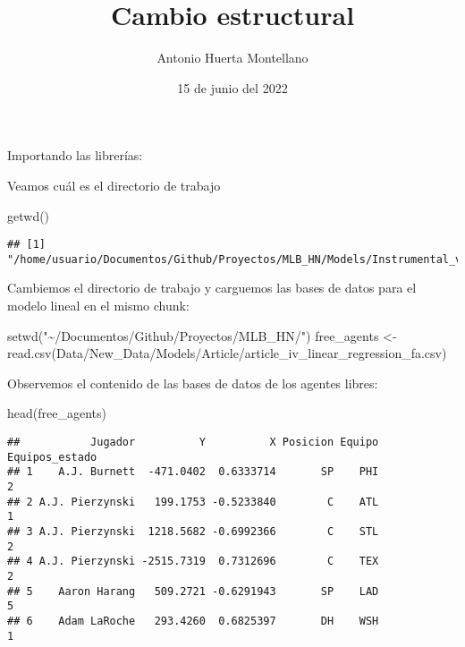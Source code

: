 \documentclass[
]{article}
\title{Cambio estructural}
\author{Antonio Huerta Montellano}
\date{15 de junio del 2022}
\newenvironment{Shaded}{\begin{snugshade}}{\end{snugshade}}
\newcommand{\FunctionTok}[1]{\textcolor[rgb]{0.00,0.00,0.00}{#1}}
\newcommand{\NormalTok}[1]{#1}
\newcommand{\OtherTok}[1]{\textcolor[rgb]{0.56,0.35,0.01}{#1}}
\newcommand{\StringTok}[1]{\textcolor[rgb]{0.31,0.60,0.02}{#1}}
\begin{document}
\maketitle

Importando las librerías:

Veamos cuál es el directorio de trabajo

\begin{Shaded}
\begin{Highlighting}[]
\FunctionTok{getwd}\NormalTok{()}
\end{Highlighting}
\end{Shaded}

\begin{verbatim}
## [1] "/home/usuario/Documentos/Github/Proyectos/MLB_HN/Models/Instrumental_variables/Free_agent"
\end{verbatim}

Cambiemos el directorio de trabajo y carguemos las bases de datos para
el modelo lineal en el mismo chunk:

\begin{Shaded}
\begin{Highlighting}[]
\FunctionTok{setwd}\NormalTok{(}\StringTok{"\textasciitilde{}/Documentos/Github/Proyectos/MLB\_HN/"}\NormalTok{)}
\NormalTok{free\_agents }\OtherTok{\textless{}{-}} \FunctionTok{read.csv}\NormalTok{(}\StringTok{\textquotesingle{}Data/New\_Data/Models/Article/article\_iv\_linear\_regression\_fa.csv\textquotesingle{}}\NormalTok{)}
\end{Highlighting}
\end{Shaded}

Observemos el contenido de las bases de datos de los agentes libres:

\begin{Shaded}
\begin{Highlighting}[]
\FunctionTok{head}\NormalTok{(free\_agents)}
\end{Highlighting}
\end{Shaded}

\begin{verbatim}
##           Jugador          Y          X Posicion Equipo Equipos_estado
## 1    A.J. Burnett  -471.0402  0.6333714       SP    PHI              2
## 2 A.J. Pierzynski   199.1753 -0.5233840        C    ATL              1
## 3 A.J. Pierzynski  1218.5682 -0.6992366        C    STL              2
## 4 A.J. Pierzynski -2515.7319  0.7312696        C    TEX              2
## 5    Aaron Harang   509.2721 -0.6291943       SP    LAD              5
## 6    Adam LaRoche   293.4260  0.6825397       DH    WSH              1
\end{verbatim}
\end{document}

